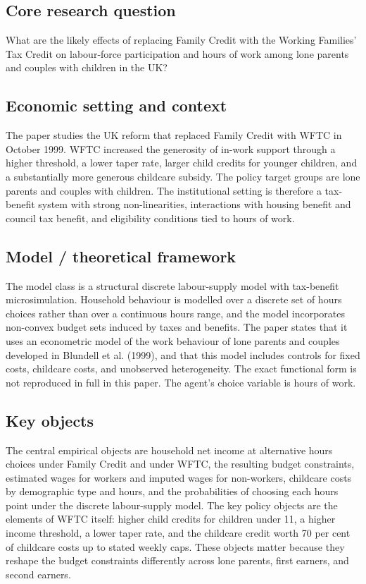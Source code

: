 \documentclass[11pt,a4paper]{article}
\begin{document}
\subsection*{Core research question}
What are the likely effects of replacing Family Credit with the Working Families’ Tax Credit on labour-force participation and hours of work among lone parents and couples with children in the UK?

\subsection*{Economic setting and context}
The paper studies the UK reform that replaced Family Credit with WFTC in October 1999. WFTC increased the generosity of in-work support through a higher threshold, a lower taper rate, larger child credits for younger children, and a substantially more generous childcare subsidy. The policy target groups are lone parents and couples with children. The institutional setting is therefore a tax-benefit system with strong non-linearities, interactions with housing benefit and council tax benefit, and eligibility conditions tied to hours of work.

\subsection*{Model / theoretical framework}
The model class is a structural discrete labour-supply model with tax-benefit microsimulation. Household behaviour is modelled over a discrete set of hours choices rather than over a continuous hours range, and the model incorporates non-convex budget sets induced by taxes and benefits. The paper states that it uses an econometric model of the work behaviour of lone parents and couples developed in Blundell et al. (1999), and that this model includes controls for fixed costs, childcare costs, and unobserved heterogeneity. The exact functional form is not reproduced in full in this paper. The agent’s choice variable is hours of work.

\subsection*{Key objects}
The central empirical objects are household net income at alternative hours choices under Family Credit and under WFTC, the resulting budget constraints, estimated wages for workers and imputed wages for non-workers, childcare costs by demographic type and hours, and the probabilities of choosing each hours point under the discrete labour-supply model. The key policy objects are the elements of WFTC itself: higher child credits for children under 11, a higher income threshold, a lower taper rate, and the childcare credit worth 70 per cent of childcare costs up to stated weekly caps. These objects matter because they reshape the budget constraints differently across lone parents, first earners, and second earners.
\end{document}
